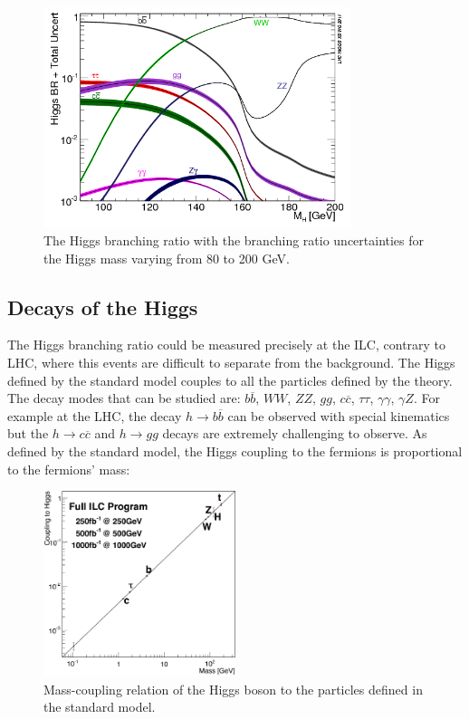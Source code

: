     
    \begin{figure}[h]
      \centering
      \includegraphics[width = 0.8\textwidth]{Pictures/Higgs/BRTotalUncertBands_lm.png}
      \caption{The Higgs branching ratio with the branching ratio uncertainties for the Higgs mass varying from 80 to 200 GeV\cite{Denner:2011mq}.}
      \label{fig:higgsProd}
    \end{figure}

    \subsection{Decays of the Higgs}
  
    The Higgs branching ratio could be measured precisely at the \gls{ILC}, contrary to \gls{LHC}, where this events are difficult to separate from the background.
    The Higgs defined by the standard model couples to all the particles defined by the theory.
    The decay modes that can be studied are: $b\overline{b}$, $WW$, $ZZ$, $gg$, $c\overline{c}$, $\tau \tau$, $\gamma \gamma$, $\gamma Z$.
    For example at the \gls{LHC}, the decay $h \rightarrow b\overline{b}$ can be observed with special kinematics but the $h \rightarrow c \overline{c}$ and $h \rightarrow gg$ decays are extremely challenging to observe.
    As defined by the standard model, the Higgs coupling to the fermions is proportional to the fermions' mass:

    \begin{figure}
      \centering
      \includegraphics[width = 0.5\textwidth]{Pictures/Higgs/Chapter_Theory_figs_mass-coupling1TeV.png}
      \caption{Mass-coupling relation of the Higgs boson to the particles defined in the standard model\cite{tian}.}
      \label{fig:coupling}
    \end{figure}

